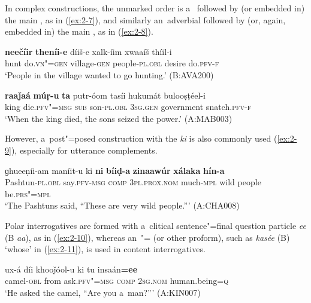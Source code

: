 In complex constructions, the unmarked order is a~ followed by (or embedded in) the main , as in (\ref{ex:2-7}), and similarly an~adverbial  followed by (or, again, embedded in) the main , as in (\ref{ex:2-8}). 

\begin{exe}
\ex
\label{ex:2-7}
\gll \textbf{neečíir} \textbf{theníi-e} díiš-e xalk-íim xwaaíš thíil-i \\
	hunt do.\textsc{vn"=gen} village\textsc{-gen} people\textsc{-pl.obl} desire do.\textsc{pfv-f} \\
\glt `People in the village wanted to go hunting.' (B:AVA200)
\end{exe}

\begin{exe}
\ex
\label{ex:2-8}
\gll \textbf{raaǰaá} \textbf{múṛ-u} \textbf{ta} putr-óom tasíi hukumát bulooṣṭéel-i \\
	king die.\textsc{pfv"=msg} \textsc{sub} son\textsc{-pl.obl} \textsc{3sg.gen} government snatch.\textsc{pfv-f} \\
\glt `When the king died, the sons seized the power.' (A:MAB003)
\end{exe}

However, a~post"=posed construction with the  \textit{ki} is also commonly used (\ref{ex:2-9}), especially for utterance complements.

\begin{exe}
\ex
\label{ex:2-9}
\gll ɡhueeṇíi-am maníit-u ki \textbf{ni} \textbf{bíiḍ-a} \textbf{zinaawúr} \textbf{xálaka} \textbf{hín-a}\\
	Pashtun-\textsc{pl.obl} say.\textsc{pfv-msg} \textsc{comp} \textsc{3pl.prox.nom} much-\textsc{mpl} wild people be.\textsc{prs"=mpl} \\
\glt `The Pashtuns said, ``These are very wild people.''' (A:CHA008)
\end{exe}

Polar interrogatives are formed with a~clitical sentence"=final question particle \textit{ee} (B \textit{aa}), as in (\ref{ex:2-10}), whereas an~"=  (or other proform), such as \textit{kasée} (B) `whose' in (\ref{ex:2-11}), is used in content interrogatives. 

\begin{exe}
\ex
\label{ex:2-10}
\gll ux-á díi khooǰóol-u ki tu insaán\textbf{=ee}\\
	camel-\textsc{obl} from ask.\textsc{pfv"=msg} \textsc{comp} \textsc{2sg.nom} human.being=\textsc{q} \\
\glt `He asked the camel, ``Are you a~man?''' (A:KIN007)
\end{exe}


